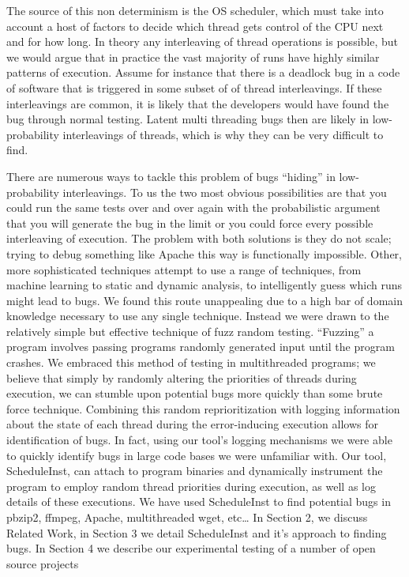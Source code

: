 \documentclass[10pt,]{article} %
\begin{document}

	The source of this non determinism is the OS scheduler, which must take into account a host of factors to decide which thread gets control of the CPU next and for how long.  In theory any interleaving of thread operations is possible, but we would argue that in practice the vast majority of runs have highly similar patterns of execution.  Assume for instance that there is a deadlock bug in a code of software that is triggered in some subset of of thread interleavings. If these interleavings are common, it is likely that the developers would have found the bug through normal testing.  Latent multi threading bugs then are likely in low-probability interleavings of threads, which is why they can be very difficult to find.   



	There are numerous ways to tackle this problem of bugs “hiding” in low-probability interleavings.  To us the two most obvious possibilities are that you could run the same tests over and over again with the probabilistic argument that you will generate the bug in the limit or you could force every possible interleaving of execution.  The problem with both solutions is they do not scale; trying to debug something like Apache this way is functionally impossible.  Other, more sophisticated techniques attempt to use a range of techniques, from machine learning to static and dynamic analysis, to intelligently guess which runs might lead to bugs.  We found this route unappealing due to a high bar of domain knowledge necessary to use any single technique.  Instead we were drawn to the relatively simple but effective technique of fuzz random testing.  “Fuzzing” a program involves passing programs randomly generated input until the program crashes.  We embraced this method of testing in multithreaded programs; we believe that simply by randomly altering the priorities of threads during execution, we can stumble upon potential bugs more quickly than some brute force technique.  Combining this random reprioritization with logging information about the state of each thread during the error-inducing execution allows for identification of bugs.  In fact, using our tool’s logging mechanisms we were able to quickly identify bugs in large code bases we were unfamiliar with.  
	Our tool, ScheduleInst, can attach to program binaries and dynamically instrument the program to employ random thread priorities during execution, as well as log details of these executions.  We have used ScheduleInst to find potential bugs in pbzip2, ffmpeg, Apache, multithreaded wget, etc…  In Section 2, we discuss Related Work, in Section 3 we detail ScheduleInst and it’s approach to finding bugs.  In Section 4 we describe our experimental testing of a number of open source projects  
\end{document}
